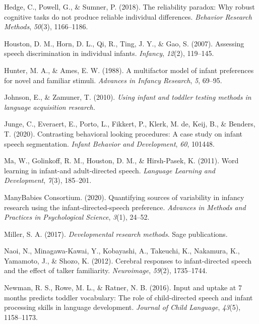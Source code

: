 \documentclass[
  man,floatsintext]{apa6}
\newlength{\cslhangindent}
\newlength{\cslentryspacingunit} %
\newenvironment{CSLReferences}[2] %
 {%
  \setlength{\parindent}{0pt}
  \ifodd #1
  \let\oldpar\par
  \def\par{\hangindent=\cslhangindent\oldpar}
  \fi
  \setlength{\parskip}{#2\cslentryspacingunit}
 }%
 {}
\begin{document}
\begin{CSLReferences}{1}{0}
\leavevmode{}%
Hedge, C., Powell, G., \& Sumner, P. (2018). The reliability paradox: Why robust cognitive tasks do not produce reliable individual differences. \emph{Behavior Research Methods}, \emph{50}(3), 1166--1186.

\leavevmode{}%
Houston, D. M., Horn, D. L., Qi, R., Ting, J. Y., \& Gao, S. (2007). Assessing speech discrimination in individual infants. \emph{Infancy}, \emph{12}(2), 119--145.

\leavevmode{}%
Hunter, M. A., \& Ames, E. W. (1988). A multifactor model of infant preferences for novel and familiar stimuli. \emph{Advances in Infancy Research}, \emph{5}, 69--95.

\leavevmode{}%
Johnson, E., \& Zamuner, T. (2010). \emph{Using infant and toddler testing methods in language acquisition research.}

\leavevmode{}%
Junge, C., Everaert, E., Porto, L., Fikkert, P., Klerk, M. de, Keij, B., \& Benders, T. (2020). Contrasting behavioral looking procedures: A case study on infant speech segmentation. \emph{Infant Behavior and Development}, \emph{60}, 101448.

\leavevmode{}%
Ma, W., Golinkoff, R. M., Houston, D. M., \& Hirsh-Pasek, K. (2011). Word learning in infant-and adult-directed speech. \emph{Language Learning and Development}, \emph{7}(3), 185--201.

\leavevmode{}%
ManyBabies Consortium. (2020). Quantifying sources of variability in infancy research using the infant-directed-speech preference. \emph{Advances in Methods and Practices in Psychological Science}, \emph{3}(1), 24--52.

\leavevmode{}%
Miller, S. A. (2017). \emph{Developmental research methods}. Sage publications.

\leavevmode{}%
Naoi, N., Minagawa-Kawai, Y., Kobayashi, A., Takeuchi, K., Nakamura, K., Yamamoto, J., \& Shozo, K. (2012). Cerebral responses to infant-directed speech and the effect of talker familiarity. \emph{Neuroimage}, \emph{59}(2), 1735--1744.

\leavevmode{}%
Newman, R. S., Rowe, M. L., \& Ratner, N. B. (2016). Input and uptake at 7 months predicts toddler vocabulary: The role of child-directed speech and infant processing skills in language development. \emph{Journal of Child Language}, \emph{43}(5), 1158--1173.


\end{CSLReferences}
\end{document}
